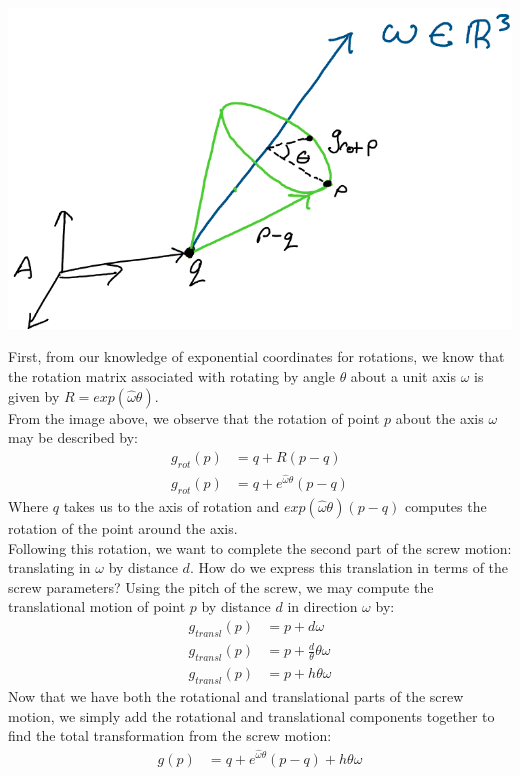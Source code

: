 \documentclass[oneside]{book}
\begin{document}
\begin{center}
    \includegraphics[scale=0.25]{images/rot_screw.png}
\end{center}
First, from our knowledge of exponential coordinates for rotations, we know that the rotation matrix associated with rotating by angle $\theta$ about a unit axis $\omega$ is given by $R = exp(\hat\omega\theta)$.\\
From the image above, we observe that the rotation of point $p$ about the axis $\omega$ may be described by:
\begin{align}
    g_{rot}(p) &= q + R(p-q)\\
    g_{rot}(p) &= q + e^{\hat\omega\theta}(p-q)
\end{align}
Where $q$ takes us to the axis of rotation and $exp(\hat\omega\theta)(p-q)$ computes the rotation of the point around the axis.\\
Following this rotation, we want to complete the second part of the screw motion: translating in $\omega$ by distance $d$. How do we express this translation in terms of the screw parameters?
Using the pitch of the screw, we may compute the translational motion of point $p$ by distance $d$ in direction $\omega$ by:
\begin{align}
    g_{transl}(p) &= p + d\omega\\
    g_{transl}(p) &= p + \frac{d}{\theta}\theta\omega\\
    g_{transl}(p) &= p + h\theta\omega
\end{align}
Now that we have both the rotational and translational parts of the screw motion, we simply add the rotational and translational components together to find the total transformation from the screw motion:
\begin{align}
    g(p) &= q + e^{\hat\omega\theta}(p-q) + h\theta\omega
\end{align}
\end{document}
